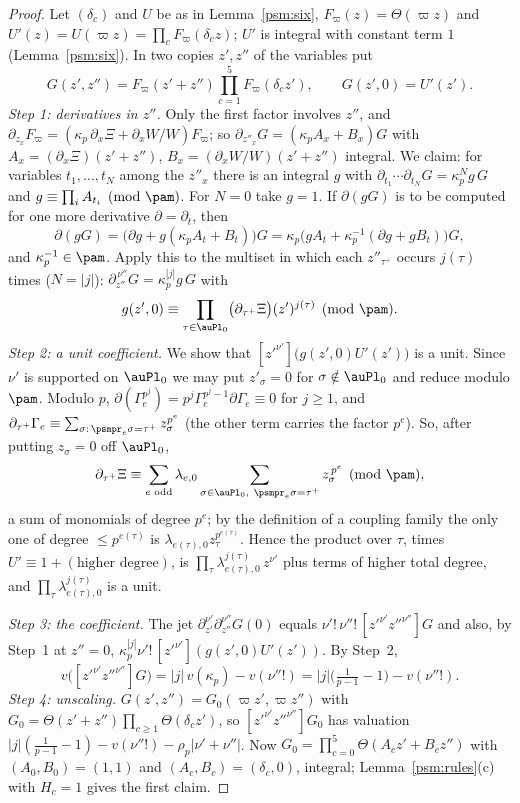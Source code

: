 \documentclass[10pt]{amsart}
\theoremstyle{definition}
\theoremstyle{remark}
\begin{document}
\begin{proof}
Let $(\delta_c)$ and $U$ be as in Lemma~\ref{psm:six}, $F_\varpi(z)=\Theta(\varpi z)$ and
$U'(z)=U(\varpi z)=\prod_cF_\varpi(\delta_cz)$; $U'$ is integral with constant term $1$
(Lemma~\ref{psm:six}). In two copies $z',z''$ of the variables put
\[
G(z',z'')=F_\varpi(z'+z'')\prod_{c=1}^5F_\varpi(\delta_cz'),\qquad G(z',0)=U'(z') .
\]
\emph{Step 1: derivatives in $z''$.} Only the first factor involves $z''$, and
$\partial_{z_x}F_\varpi=(\kappa_p\,\partial_x\Xi+\partial_xW/W)F_\varpi$; so $\partial_{z''_x}G=(\kappa_pA_x+B_x)G$
with $A_x=(\partial_x\Xi)(z'+z'')$, $B_x=(\partial_xW/W)(z'+z'')$ integral. We claim: for variables
$t_1,\dots,t_N$ among the $z''_x$ there is an integral $g$ with $\partial_{t_1}\cdots\partial_{t_N}G=
\kappa_p^Ng\,G$ and $g\equiv\prod_iA_{t_i}\pmod\pam$. For $N=0$ take $g=1$. If $\partial(g G)$ is
to be computed for one more derivative $\partial=\partial_t$, then
\[
\partial(gG)=\bigl(\partial g+g(\kappa_pA_t+B_t)\bigr)G=\kappa_p\bigl(gA_t+\kappa_p^{-1}(\partial g+
gB_t)\bigr)G,
\]
and $\kappa_p^{-1}\in\pam$. Apply this to the multiset in which each $z''_{\tau^+}$ occurs $j(\tau)$
times ($N=|j|$): $\partial_{z''}^{\,\nu''}G=\kappa_p^{|j|}g\,G$ with
\[
g(z',0)\equiv\prod_{\tau\in\auPl_0}\bigl(\partial_{\tau^+}\Xi\bigr)(z')^{j(\tau)}\pmod\pam .
\]
\emph{Step 2: a unit coefficient.} We show that $[z'^{\nu'}]\bigl(g(z',0)U'(z')\bigr)$ is a unit.
Since $\nu'$ is supported on $\auPl_0$ we may put $z'_\sigma=0$ for $\sigma\notin\auPl_0$ and reduce
modulo $\pam$. Modulo $p$, $\partial(\Gamma_e^{p^j})=p^j\Gamma_e^{p^j-1}\partial\Gamma_e\equiv0$ for
$j\ge1$, and $\partial_{\tau^+}\Gamma_e\equiv\sum_{\sigma:\,\psmpr_e\sigma=\tau^+}z_\sigma^{p^e}$
(the other term carries the factor $p^e$). So, after putting $z_\sigma=0$ off $\auPl_0$,
\[
\partial_{\tau^+}\Xi\equiv\sum_{e\text{ odd}}\lambda_{e,0}\sum_{\sigma\in\auPl_0,\ \psmpr_e\sigma=
\tau^+}z_\sigma^{\,p^e}\pmod\pam ,
\]
a sum of monomials of degree $p^e$; by the definition of a coupling family the only one of degree
$\le p^{e(\tau)}$ is $\lambda_{e(\tau),0}z_\tau^{p^{e(\tau)}}$. Hence the product over $\tau$, times
$U'\equiv1+(\text{higher degree})$, is $\prod_\tau\lambda_{e(\tau),0}^{j(\tau)}\,z^{\nu'}$ plus terms of
higher total degree, and $\prod_\tau\lambda_{e(\tau),0}^{j(\tau)}$ is a unit.

\emph{Step 3: the coefficient.} The jet $\partial_{z'}^{\nu'}\partial_{z''}^{\nu''}G(0)$ equals
$\nu'!\,\nu''!\,[z'^{\nu'}z''^{\nu''}]G$ and also, by Step~1 at $z''=0$, $\kappa_p^{|j|}\nu'!\,
[z'^{\nu'}](g(z',0)U'(z'))$. By Step~2,
\[
v\bigl([z'^{\nu'}z''^{\nu''}]G\bigr)=|j|\,v(\kappa_p)-v(\nu''!)=|j|\bigl(\tfrac1{p-1}-1\bigr)-
v(\nu''!) .
\]
\emph{Step 4: unscaling.} $G(z',z'')=G_0(\varpi z',\varpi z'')$ with $G_0=\Theta(z'+z'')\prod_{c\ge1}
\Theta(\delta_cz')$, so $[z'^{\nu'}z''^{\nu''}]G_0$ has valuation $|j|(\frac1{p-1}-1)-v(\nu''!)-
\rho_p|\nu'+\nu''|$. Now $G_0=\prod_{c=0}^5\Theta(A_cz'+B_cz'')$ with $(A_0,B_0)=(1,1)$ and
$(A_c,B_c)=(\delta_c,0)$, integral; Lemma~\ref{psm:rules}(c) with $H_c=1$ gives the first claim.


\end{proof}
\end{document}
